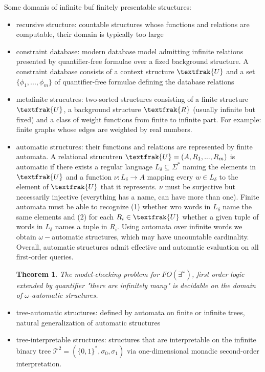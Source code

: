 \documentclass[]{article}
\newtheorem{theorem}{Theorem}
\begin{document}
Some domanis of infinite buf finitely presentable structures: 
\begin{itemize}
    \item recursive structure: countable structures whose functions and relations are computable, 
        their domain is typically too large 
    \item constraint database: modern database model admitting infinite relations presented by quantifier-free formulae
        over a fized background structure. A constraint database consists of a context structure $\textfrak{U}$ and a set $\{\phi_1, ..., \phi_m\}$ of quantifier-free formulae defining the database relations
    \item metafinite strucutres: two-sorted structures consisting of a finite structure $\textfrak{U}$, a background structure $\textfrak{R}$ (usually infinite but fixed) and a class of weight functions from finite to infinite part. For example: finite graphs whose edges are weighted by real numbers. 
    \item automatic structures: their functions and relations are represented by finite automata. A relational strucutren $\textfrak{U}=(A, R_1, ..., R_m)$ is automatic if there exists a regular language $L_\delta \subseteq \Sigma^*$ naming the elements in $\textfrak{U}$
        and a function $\nu : L_\delta \rightarrow A$ mapping every $w\in L_\delta$ to the element of $\textfrak{U}$ that it represents. 
        $\nu$ must be surjective but necessarily injective (everything has a name, can have more than one). 
        Finite automata must be able to recognize (1) whether wro words in $L_\delta$ name the same elements and (2) for each $R_i \in \textfrak{U}$ whether a given tuple of words in $L_\delta$ names a tuple in $R_i$.
        Using automata over infinite words we obtain $\omega-$automatic structures, which may have uncountable cardinality. 
        Overall, automatic structures admit effective and automatic evaluation on all first-order queries. 
        \begin{theorem}
            The model-checking problem for $FO(\exists^\omega)$, first order logic extended by quantifier "there are infinitely many" is decidable on the domain of $\omega$-automatic structures. 
        \end{theorem}
    \item tree-automatic structures: defined by automata on finite or infinite trees, natural generalization of automatic structures 
    \item tree-interpretable structures: structures that are interpretable on the infinite binary tree $\mathcal{T}^2=(\{0,1\}^*, \sigma_0, \sigma_1)$ via one-dimensional monadic second-order interpretation. 

\end{itemize}
\end{document}
